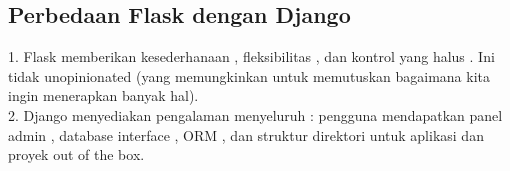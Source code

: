 \documentclass[12pt,a4paper]{article}
\begin{document}
\subsection{Perbedaan Flask dengan Django}
1.	Flask memberikan kesederhanaan , fleksibilitas , dan kontrol yang halus . Ini tidak unopinionated (yang memungkinkan untuk memutuskan bagaimana kita ingin menerapkan banyak hal).\\
2.  Django menyediakan pengalaman menyeluruh : pengguna mendapatkan panel admin , database interface , ORM , dan struktur direktori untuk aplikasi dan proyek out of the box.
\end{document}
